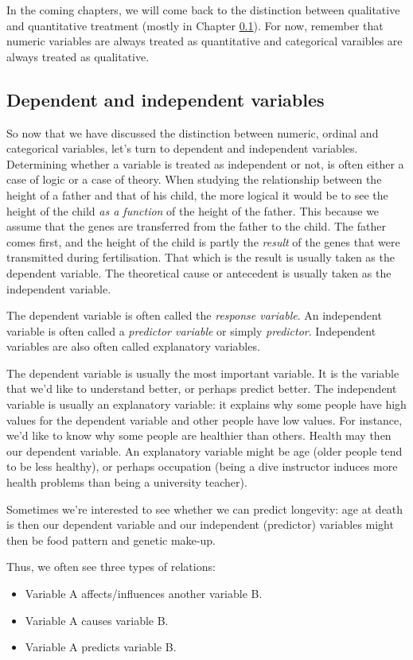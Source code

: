 In the coming chapters, we will come back to the distinction between qualitative and quantitative treatment (mostly in Chapter \ref{}). For now, remember that numeric variables are always treated as quantitative and categorical varaibles are always treated as qualitative.


\subsection{Dependent and independent variables}
So now that we have discussed the distinction between numeric, ordinal and categorical variables, let's turn to dependent and independent variables. Determining whether a variable is treated as independent or not, is often either a case of logic or a case of theory. When studying the relationship between the height of a father and that of his child, the more logical it would be to see the height of the child \textit{as a function} of the height of the father. This because we assume that the genes are transferred from the father to the child. The father comes first, and the height of the child is partly the \textit{result} of the genes that were transmitted during fertilisation. That which is the result is usually taken as the dependent variable. The theoretical cause or antecedent is usually taken as the independent variable. 

The dependent variable is often called the \textit{response variable}. An independent variable is often called a \textit{predictor variable} or simply \textit{predictor}. Independent variables are also often called explanatory variables.

The dependent variable is usually the most important variable. It is the variable that we'd like to understand better, or perhaps predict better. The independent variable is usually an explanatory variable: it explains why some people have high values for the dependent variable and other people have low values. For instance, we'd like to know why some people are healthier than others. Health may then our dependent variable. An explanatory variable might be age (older people tend to be less healthy), or perhaps occupation (being a dive instructor induces more health problems than being a university teacher). 

Sometimes we're interested to see whether we can predict longevity: age at death is then our dependent variable and our independent (predictor) variables might then be food pattern and genetic make-up. 

Thus, we often see three types of relations:
\begin{itemize}
\item Variable A affects/influences another variable B.
\item Variable A causes variable B.
\item Variable A predicts variable B.
\end{itemize}

